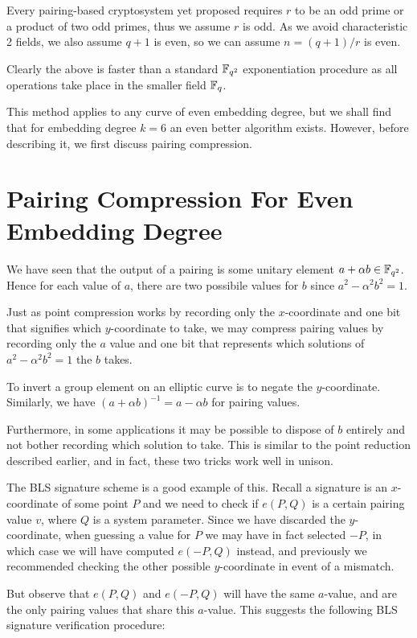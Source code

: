 Every pairing-based cryptosystem yet
proposed requires $r$ to be an odd prime or a product of two odd primes,
thus we assume $r$ is odd. As we avoid characteristic 2 fields,
we also assume $q + 1$ is even, so we
can assume $n = (q + 1) / r$ is even.

Clearly the above is faster than a standard $\mathbb{F}_{q^2}$ exponentiation
procedure as all operations take place in the smaller field $\mathbb{F}_q$.

This method applies to any curve of even embedding degree, but we shall
find that for embedding degree $k = 6$ an even better algorithm exists.
However, before describing it, we first discuss pairing compression.

\section {\label{sec:pairingcompressioneven}Pairing Compression For Even Embedding Degree}

We have seen that the output of a pairing is some unitary element
$a + \alpha b \in \mathbb{F}_{q^2}$.
Hence for each value of $a$, there are two possibile values for $b$
since $a^2 - \alpha^2 b^2 = 1$.

Just as point compression works by recording only the $x$-coordinate and
one bit that signifies which $y$-coordinate to take, we may compress pairing
values by recording only the $a$ value and one bit that represents which
solutions of $a^2 - \alpha^2 b^2 = 1$ the $b$ takes.

To invert a group element on an elliptic curve is to negate the $y$-coordinate.
Similarly, we have $(a + \alpha b)^{-1} = a - \alpha b$ for pairing values.

Furthermore, in some applications it may
be possible to dispose of $b$ entirely and not bother recording which solution
to take. This is similar to the point reduction described earlier, and
in fact, these two tricks work well in unison.

The BLS signature scheme is a good example of this.
Recall a signature is an $x$-coordinate of some point $P$ and we need to
check if $e(P, Q)$ is a certain pairing value $v$,
where $Q$ is a system parameter.
Since we have discarded the $y$-coordinate, when guessing a value for $P$
we may have in fact selected $-P$, in which case we will have computed
$e(-P, Q)$ instead, and previously we recommended checking the other possible
$y$-coordinate in event of a mismatch.

But observe that $e(P,Q)$ and $e(-P,Q)$ will have the same $a$-value,
and are the only pairing values that share this $a$-value.
This suggests the following BLS signature verification procedure:


